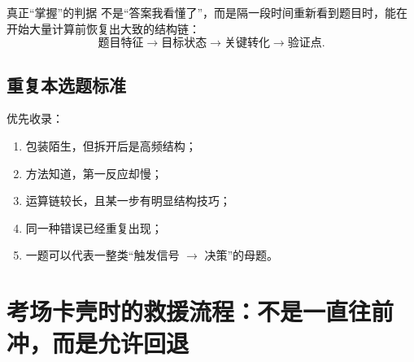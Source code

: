 \documentclass[11pt,a4paper]{ctexart}
\begin{document}
\begin{trainingbox}{真正“掌握”的判据}
不是“答案我看懂了”，而是隔一段时间重新看到题目时，能在开始大量计算前恢复出大致的结构链：
\[
\text{题目特征}\rightarrow\text{目标状态}\rightarrow\text{关键转化}\rightarrow\text{验证点}.
\]
\end{trainingbox}

\subsection{重复本选题标准}
优先收录：
\begin{enumerate}
  \item 包装陌生，但拆开后是高频结构；
  \item 方法知道，第一反应却慢；
  \item 运算链较长，且某一步有明显结构技巧；
  \item 同一种错误已经重复出现；
  \item 一题可以代表一整类“触发信号 $\rightarrow$ 决策”的母题。
\end{enumerate}

\newpage

\section{考场卡壳时的救援流程：不是一直往前冲，而是允许回退}
\end{document}
